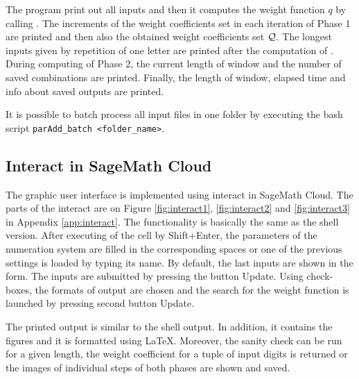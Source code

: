 The program print out all inputs and then it computes the weight function $q$ by calling . The increments of the weight coefficients set in each iteration of Phase 1 are printed and then also the obtained weight coefficients set $\mathcal{Q}$. The longest inputs given by repetition of one letter are printed after the computation of . During computing of Phase 2, the current length of window and the number of saved combinations are printed. Finally, the length of window, elapsed time and info about saved outputs are printed.  

It is possible to batch process all input files in one folder by executing the bash script \verb+parAdd_batch <folder_name>+.  

\subsection{Interact in SageMath Cloud}
The graphic user interface is implemented using interact in SageMath Cloud. The parts of the interact are on Figure \ref{fig:interact1}, \ref{fig:interact2} and \ref{fig:interact3} in Appendix \ref{app:interact}. The functionality is basically the same as the shell version. After executing of the cell by Shift+Enter, the parameters of the numeration system are filled in the corresponding spaces or one of the previous settings is loaded by typing its name.  By default, the last inputs are shown in the form. The inputs are submitted by pressing the button Update. Using check-boxes, the formats of output are chosen and the search for the weight function is launched by pressing second button Update.

The printed output is similar to the shell output. In addition, it contains the figures and it is formatted using \LaTeX. Moreover, the sanity check can be run for a given length, the weight coefficient for a tuple of  input digits is returned or the images of individual steps of both phases are shown and saved.
